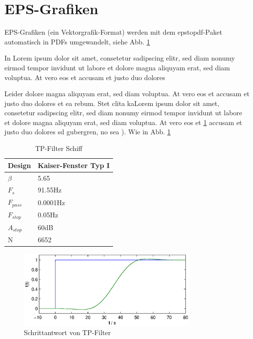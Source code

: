 \section{EPS-Grafiken}
\label{sec:epsgrafiken}

EPS-Grafiken (ein Vektorgrafik-Format) werden mit dem epstopdf-Paket automatisch in PDFs umgewandelt, siehe Abb. \ref{fig:yyy}

In  
Lorem ipsum dolor sit amet, consetetur sadipscing elitr, sed diam nonumy eirmod tempor invidunt ut labore et dolore magna aliquyam erat, sed diam voluptua. At vero eos et accusam et justo duo dolores 

Leider 
dolore magna aliquyam erat, sed diam voluptua. At vero eos et accusam et justo duo dolores et ea rebum. Stet clita kaLorem ipsum dolor sit amet, consetetur sadipscing elitr, sed diam nonumy eirmod tempor invidunt ut labore et dolore magna aliquyam erat, sed diam voluptua. At vero eos et \ref{tab:xxx} accusam et justo duo dolores sd gubergren, no sea  ). Wie in Abb. \ref{fig:yyy} 
\begin{table}[htb]
	\centering
  \caption{TP-Filter Schiff}
	\label{tab:xxx}
	\begin{tabular}{l l}
    \toprule
    Design & Kaiser-Fenster Typ I \\
    \midrule
    $\beta$ & 5.65 \\
    $F_s$ & 91.55Hz \\
    $F_{pass}$ & 0.0001Hz \\
    $F_{stop}$ & 0.05Hz \\ 
    $A_{stop}$ & 60dB \\
    N & 6652 \\		
    \bottomrule
    \end{tabular}
\end{table}
\begin{figure}[htb]%
	\centering
	\includegraphics[width=0.8\textwidth]{pictures/tp_schiff}%
  \caption{ Schrittantwort von TP-Filter}%
	\label{fig:yyy}%
\end{figure}

